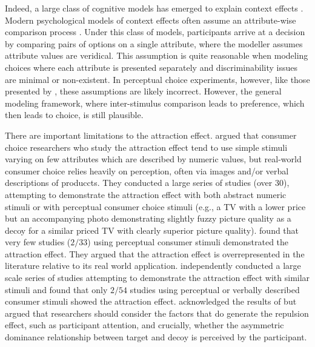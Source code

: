 Indeed, a large class of cognitive models has emerged to explain context effects \parencite{bhatiaAssociationsAccumulationPreference2013b,noguchiMultialternativeDecisionSampling2018a,trueblood2014multiattribute,wollschlager2NaryChoiceTree2012a,bergnerVAMPVotingAgent2019b,spektor2019similarity}. Modern psychological models of context effects often assume an attribute-wise comparison process \parencite{roeMultialternativeDecisionField2001a,trueblood2013not,usherLossAversionInhibition2004a,bhatiaAssociationsAccumulationPreference2013b}. Under this class of models, participants arrive at a decision by comparing pairs of options on a single attribute, where the modeller assumes attribute values are veridical. This assumption is quite reasonable when modeling choices where each attribute is presented separately and discriminability issues are minimal or non-existent. In perceptual choice experiments, however, like those presented by \textcite{trueblood2013not}, these assumptions are likely incorrect. However, the general modeling framework, where inter-stimulus comparison leads to preference, which then leads to choice, is still plausible. 

There are important limitations to the attraction effect. \textcite{frederickLimitsAttraction2014b} argued that consumer choice researchers who study the attraction effect tend to use simple stimuli varying on few attributes which are described by numeric values, but real-world consumer choice relies heavily on perception, often via images and/or verbal descriptions of produccts. They conducted a large series of studies (over 30), attempting to demonstrate the attraction effect with both abstract numeric stimuli or with perceptual consumer choice stimuli (e.g., a TV with a lower price but an accompanying photo demonstrating slightly fuzzy picture quality as a decoy for a similar priced TV with clearly superior picture quality). \textcite{frederickLimitsAttraction2014b} found that very few studies ($2/33$) using perceptual consumer stimuli demonstrated the attraction effect. They argued that the attraction effect is overrepresented in the literature relative to its real world application. \textcite{yangMoreEvidenceChallenging2014} independently conducted a large scale series of studies attempting to demonstrate the attraction effect with similar stimuli and found that only $2/54$ studies using perceptual or verbally described consumer stimuli showed the attraction effect. \textcite{simonson2014vices} acknowledged the results of \textcite{frederickLimitsAttraction2014b} but argued that researchers should consider the factors that do generate the repulsion effect, such as participant attention, and crucially, whether the asymmetric dominance relationship between target and decoy is perceived by the participant. 

